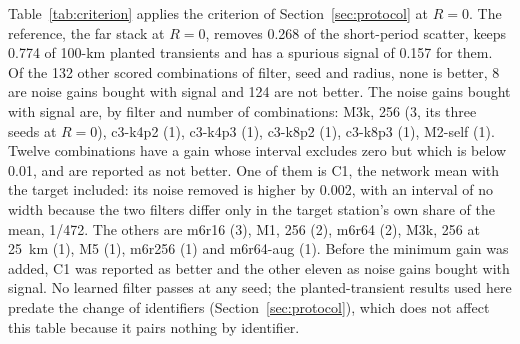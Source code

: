 \documentclass[preprint,12pt,authoryear]{elsarticle}
\begin{document}
Table~\ref{tab:criterion} applies the criterion of Section~\ref{sec:protocol} at $R = 0$. The reference, the far stack at $R = 0$, removes 0.268 of the short-period scatter, keeps 0.774 of 100-km planted transients and has a spurious signal of 0.157 for them. Of the 132 other scored combinations of filter, seed and radius, none is better, 8 are noise gains bought with signal and 124 are not better. The noise gains bought with signal are, by filter and number of combinations: M3k, 256 (3, its three seeds at $R = 0$), c3-k4p2 (1), c3-k4p3 (1), c3-k8p2 (1), c3-k8p3 (1), M2-self (1). Twelve combinations have a gain whose interval excludes zero but which is below 0.01, and are reported as not better. One of them is C1, the network mean with the target included: its noise removed is higher by 0.002, with an interval of no width because the two filters differ only in the target station's own share of the mean, 1/472. The others are m6r16 (3), M1, 256 (2), m6r64 (2), M3k, 256 at 25~km (1), M5 (1), m6r256 (1) and m6r64-aug (1). Before the minimum gain was added, C1 was reported as better and the other eleven as noise gains bought with signal. No learned filter passes at any seed; the planted-transient results used here predate the change of identifiers (Section~\ref{sec:protocol}), which does not affect this table because it pairs nothing by identifier.
\end{document}
